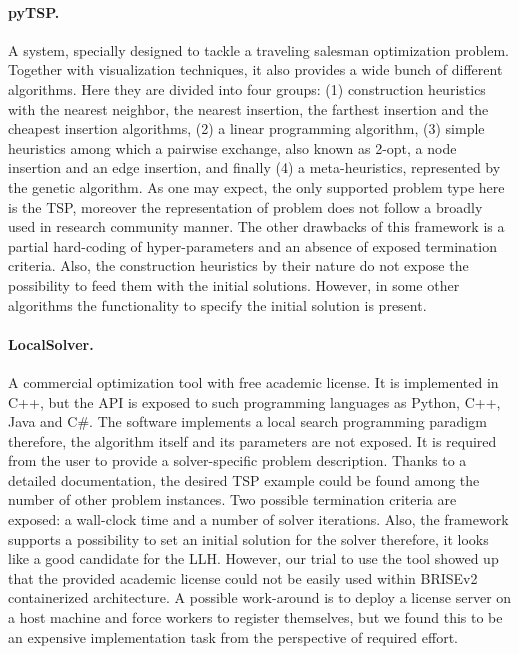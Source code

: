 \paragraph{pyTSP.} A system, specially designed to tackle a traveling salesman optimization problem. Together with visualization techniques, it also provides a wide bunch of different algorithms. Here they are divided into four groups: (1) construction heuristics with the nearest neighbor, the nearest insertion, the farthest insertion and the cheapest insertion algorithms, (2) a linear programming algorithm, (3) simple heuristics among which a pairwise exchange, also known as 2-opt, a node insertion and an edge insertion, and finally (4) a meta-heuristics, represented by the genetic algorithm. As one may expect, the only supported problem type here is the TSP, moreover the representation of problem does not follow a broadly used in research community manner. The other drawbacks of this framework is a partial hard-coding of hyper-parameters and an absence of exposed termination criteria. Also, the construction heuristics by their nature do not expose the possibility to feed them with the initial solutions. However, in some other algorithms the functionality to specify the initial solution is present.

\paragraph{LocalSolver.} A commercial optimization tool with free academic license. It is implemented in C++, but the API is exposed to such programming languages as Python, C++, Java and C\#. The software implements a local search programming paradigm~\cite{benoist2010toward,benoist2011localsolver} therefore, the algorithm itself and its parameters are not exposed. It is required from the user to provide a solver-specific problem description. Thanks to a detailed documentation, the desired TSP example could be found among the number of other problem instances. Two possible termination criteria are exposed: a wall-clock time and a number of solver iterations. Also, the framework supports a possibility to set an initial solution for the solver therefore, it looks like a good candidate for the LLH. However, our trial to use the tool showed up that the provided academic license could not be easily used within BRISEv2 containerized architecture. A possible work-around is to deploy a license server on a host machine and force workers to register themselves, but we found this to be an expensive implementation task from the perspective of required effort.

